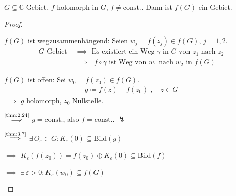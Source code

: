 \begin{theorem}[Gebietstreue] \label{thm:3.11}
  $G \subseteq \mathbb{C}$ Gebiet, $f$ holomorph in $G$, $f \neq \mathrm{const.}$. Dann ist $f(G)$ ein Gebiet.
  
  \begin{proof}
    \begin{enum-arab}
      \item $f(G)$ ist wegzusammenhängend: Seien $w_j = f(z_j) \in f(G)$, $j=1,2$.
      \begin{align*}
        \text{$G$ Gebiet }
        &\implies \text{ Es existiert ein Weg $\gamma$ in $G$ von $z_1$ nach $z_2$} \\
        &\implies \text{ $f \circ \gamma$ ist Weg von $w_1$ nach $w_2$ in $f(G)$}
      \end{align*}
      
      \item $f(G)$ ist offen: Sei $w_0 = f(z_0) \in f(G)$.
      \begin{align*}
        g \coloneq f(z) - f(z_0) \; , \quad z \in G
      \end{align*}
      $\implies$ $g$ holomorph, $z_0$ Nullstelle.
      
      
      $\overset{\text{\ref{thm:2.24}}}{\implies}$ $g = \mathrm{const.}$, also $f = \mathrm{const.}$. $\lightning$
      
      
      $\overset{\text{\ref{thm:3.7}}}{\implies}$ $\exists \, O_\varepsilon \in G : K_\varepsilon(0) \subseteq \mathrm{Bild}(g)$
      
      $\implies$ $K_\varepsilon(f(z_0)) = f(z_0) \oplus K_\varepsilon(0) \subseteq \mathrm{Bild}(f)$
      
      $\implies$ $\exists \, \varepsilon > 0 : K_\varepsilon(w_0) \subseteq f(G)$
    \end{enum-arab}
  \end{proof}
\end{theorem}

